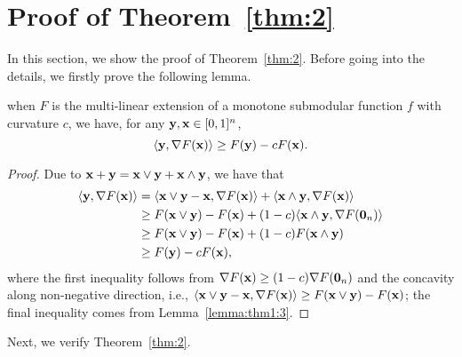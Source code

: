 \section{Proof of Theorem~\ref{thm:2}} \label{append:proof2}
In this section, we show the proof of Theorem~\ref{thm:2}.
Before going into the details, we firstly prove the following lemma.
\begin{lemma}\label{lemma:thm2:1}
	when  $F$ is the multi-linear extension of a monotone submodular function $f$ with curvature $c$, we have, for any $\mathbf{y},\mathbf{x}\in[0,1]^{n}$,
	\begin{equation*}
		\langle\mathbf{y},\nabla F(\mathbf{x})\rangle\ge F(\mathbf{y})-cF(\mathbf{x}).
	\end{equation*}
\end{lemma}
\begin{proof}
Due to $\mathbf{x}+\mathbf{y}=\mathbf{x}\lor\mathbf{y}+\mathbf{x}\land\mathbf{y}$, we have that 
\begin{equation*}
	\begin{aligned}
		\langle\mathbf{y},\nabla F(\mathbf{x})\rangle&=\langle\mathbf{x}\lor\mathbf{y}-\mathbf{x},\nabla F(\mathbf{x})\rangle+\langle\mathbf{x}\land\mathbf{y},\nabla F(\mathbf{x})\rangle\\
		&\ge F(\mathbf{x}\lor\mathbf{y})-F(\mathbf{x})+(1-c)\langle\mathbf{x}\land\mathbf{y},\nabla F(\textbf{0}_{n})\rangle\\
		&\ge F(\mathbf{x}\lor\mathbf{y})-F(\mathbf{x})+(1-c)F(\mathbf{x}\land\mathbf{y})\\
		&\ge F(\mathbf{y})-cF(\mathbf{x}),
	\end{aligned}
\end{equation*} where the first inequality follows from $\nabla F(\mathbf{x})\ge(1-c)\nabla F(\textbf{0}_{n})$ and the concavity along non-negative direction, i.e., $\langle\mathbf{x}\lor\mathbf{y}-\mathbf{x},\nabla F(\mathbf{x})\rangle\ge F(\mathbf{x}\lor\mathbf{y})-F(\mathbf{x})$; the final inequality comes from Lemma~\ref{lemma:thm1:3}.
\end{proof}
Next, we verify Theorem~\ref{thm:2}.
